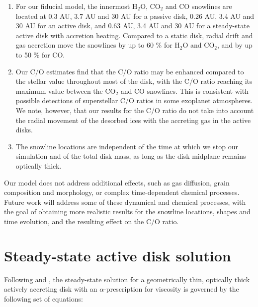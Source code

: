 \documentclass[apj]{emulateapj}
\begin{document}
\begin{enumerate}
\item For our fiducial model, the innermost H$_2$O, CO$_2$ and CO snowlines are located at 0.3 AU, 3.7 AU and 30 AU for a passive disk, 0.26 AU, 3.4 AU and 30 AU for an active disk, and 0.63 AU, 3.4 AU and 30 AU for a steady-state active disk with accretion heating. Compared to a static disk, radial drift and gas accretion move the snowlines by up to 60 \% for H$_2$O and CO$_2$, and by up to 50 \% for CO. 

\item Our C/O estimates find that the C/O ratio may be enhanced compared to the stellar value throughout most of the disk, with the C/O ratio reaching its maximum value between the CO$_2$ and CO snowlines. This is consistent with possible detections of superstellar C/O ratios in some exoplanet atmospheres. We note, however, that our results for the C/O ratio do not take into account the radial movement of the desorbed ices with the accreting gas in the active disks.

\item The snowline locations are independent of the time at which we stop our simulation and of the total disk mass, as long as the disk midplane remains optically thick. %

\end{enumerate}

Our model does not address additional effects, such as gas diffusion, grain composition and morphology, or complex time-dependent chemical processes. Future work will address some of these dynamical and chemical processes, with the goal of obtaining more realistic results for the snowline locations, shapes and time evolution, and the resulting effect on the C/O ratio. %

\appendix
\section{Steady-state active disk solution} \label{app:steadystate}

Following \citet{shakura73} and \citet{armitage10}, the steady-state solution for a geometrically thin, optically thick actively accreting disk with an $\alpha$-prescription for viscosity is governed by the following set of equations:
\end{document}
